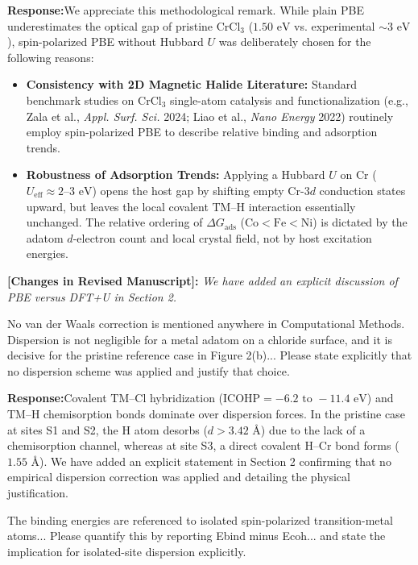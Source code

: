 \documentclass[11pt, sans, a4paper]{moderncv}
\newcommand{\response}{\vspace{0.4em}\noindent\textbf{\color{actionblue}Response:}\hspace{0.5em}}
\newcommand{\manuscriptchange}[1]{\vspace{0.3em}\noindent\textbf{\color{acsblue}[Changes in Revised Manuscript]:} \textit{#1}\vspace{0.4em}}
\begin{document}
\response We appreciate this methodological remark. While plain PBE underestimates the optical gap of pristine $\text{CrCl}_3$ ($1.50\text{ eV}$ vs. experimental $\sim 3\text{ eV}$), spin-polarized PBE without Hubbard $U$ was deliberately chosen for the following reasons:
\begin{itemize}[leftmargin=1.5em, itemsep=0.2em]
    \item \textbf{Consistency with 2D Magnetic Halide Literature:} Standard benchmark studies on $\text{CrCl}_3$ single-atom catalysis and functionalization (e.g., Zala et al., \textit{Appl. Surf. Sci.} 2024; Liao et al., \textit{Nano Energy} 2022) routinely employ spin-polarized PBE to describe relative binding and adsorption trends.
    \item \textbf{Robustness of Adsorption Trends:} Applying a Hubbard $U$ on Cr ($U_{\mathrm{eff}} \approx 2\text{--}3\text{ eV}$) opens the host gap by shifting empty Cr-$3d$ conduction states upward, but leaves the local covalent $\text{TM--H}$ interaction essentially unchanged. The relative ordering of $\Delta G_{\mathrm{ads}}$ ($\text{Co} < \text{Fe} < \text{Ni}$) is dictated by the adatom $d$-electron count and local crystal field, not by host excitation energies.
\end{itemize}

\manuscriptchange{We have added an explicit discussion of PBE versus DFT+U in Section 2.}

\begin{reviewercomment}
No van der Waals correction is mentioned anywhere in Computational Methods. Dispersion is not negligible for a metal adatom on a chloride surface, and it is decisive for the pristine reference case in Figure 2(b)... Please state explicitly that no dispersion scheme was applied and justify that choice.
\end{reviewercomment}

\response Covalent $\text{TM--Cl}$ hybridization ($\mathrm{ICOHP} = -6.2\text{ to } -11.4\text{ eV}$) and $\text{TM--H}$ chemisorption bonds dominate over dispersion forces. In the pristine case at sites S1 and S2, the H atom desorbs ($d > 3.42\text{ \AA}$) due to the lack of a chemisorption channel, whereas at site S3, a direct covalent $\text{H--Cr}$ bond forms ($1.55\text{ \AA}$). We have added an explicit statement in Section 2 confirming that no empirical dispersion correction was applied and detailing the physical justification.

\begin{reviewercomment}
The binding energies are referenced to isolated spin-polarized transition-metal atoms... Please quantify this by reporting Ebind minus Ecoh... and state the implication for isolated-site dispersion explicitly.
\end{reviewercomment}
\end{document}
